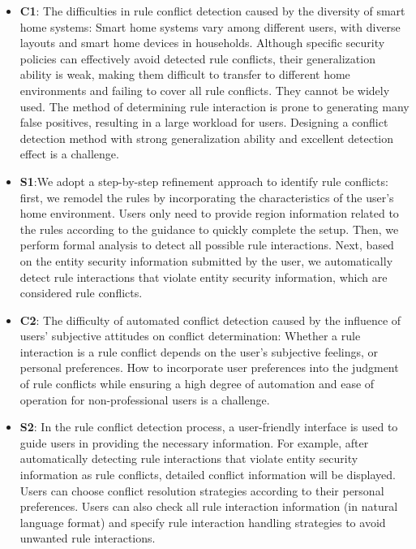 \begin{itemize}
	\item \textbf{C1}: The difficulties in rule conflict detection caused by the diversity of smart home systems: Smart home systems vary among different users, with diverse layouts and smart home devices in households. Although specific security policies can effectively avoid detected rule conflicts, their generalization ability is weak, making them difficult to transfer to different home environments and failing to cover all rule conflicts. They cannot be widely used. The method of determining rule interaction is prone to generating many false positives, resulting in a large workload for users. Designing a conflict detection method with strong generalization ability and excellent detection effect is a challenge.
	\item \textbf{S1}:We adopt a step-by-step refinement approach to identify rule conflicts: first, we remodel the rules by incorporating the characteristics of the user's home environment. Users only need to provide region information related to the rules according to the guidance to quickly complete the setup. Then, we perform formal analysis to detect all possible rule interactions. Next, based on the entity security information submitted by the user, we automatically detect rule interactions that violate entity security information, which are considered rule conflicts.
	
	\item \textbf{C2}: The difficulty of automated conflict detection caused by the influence of users' subjective attitudes on conflict determination: Whether a rule interaction is a rule conflict depends on the user's subjective feelings, or personal preferences. How to incorporate user preferences into the judgment of rule conflicts while ensuring a high degree of automation and ease of operation for non-professional users is a challenge.
	\item \textbf{S2}: In the rule conflict detection process, a user-friendly interface is used to guide users in providing the necessary information. For example, after automatically detecting rule interactions that violate entity security information as rule conflicts, detailed conflict information will be displayed. Users can choose conflict resolution strategies according to their personal preferences. Users can also check all rule interaction information (in natural language format) and specify rule interaction handling strategies to avoid unwanted rule interactions.
	

\end{itemize}
